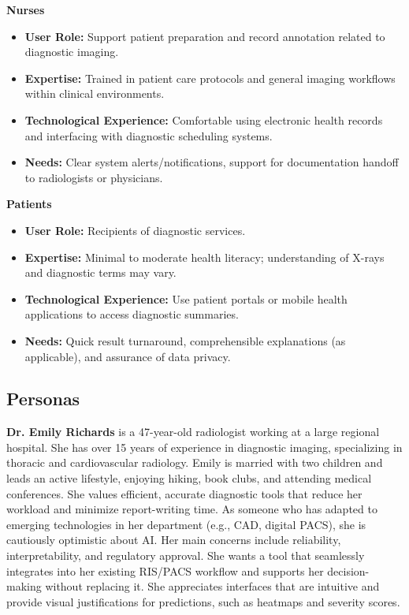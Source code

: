 \documentclass[12pt]{article}
\begin{document}
\textbf{Nurses}
\begin{itemize}
    \item \textbf{User Role:} Support patient preparation and record annotation related to diagnostic imaging.
    \item \textbf{Expertise:} Trained in patient care protocols and general imaging workflows within clinical environments.
    \item \textbf{Technological Experience:} Comfortable using electronic health records and interfacing with diagnostic scheduling systems.
    \item \textbf{Needs:} Clear system alerts/notifications, support for documentation handoff to radiologists or physicians.
\end{itemize}

\textbf{Patients}
\begin{itemize}
    \item \textbf{User Role:} Recipients of diagnostic services.
    \item \textbf{Expertise:} Minimal to moderate health literacy; understanding of X-rays and diagnostic terms may vary.
    \item \textbf{Technological Experience:} Use patient portals or mobile health applications to access diagnostic summaries.
    \item \textbf{Needs:} Quick result turnaround, comprehensible explanations (as applicable), and assurance of data privacy.
\end{itemize}

\subsection{Personas}
\textbf{Dr. Emily Richards} is a 47-year-old radiologist working at a large regional hospital. She has over 15 years of experience in diagnostic imaging, specializing in thoracic and cardiovascular radiology. Emily is married with two children and leads an active lifestyle, enjoying hiking, book clubs, and attending medical conferences. She values efficient, accurate diagnostic tools that reduce her workload and minimize report-writing time. As someone who has adapted to emerging technologies in her department (e.g., CAD, digital PACS), she is cautiously optimistic about AI. Her main concerns include reliability, interpretability, and regulatory approval. She wants a tool that seamlessly integrates into her existing RIS/PACS workflow and supports her decision-making without replacing it. She appreciates interfaces that are intuitive and provide visual justifications for predictions, such as heatmaps and severity scores.
\end{document}
